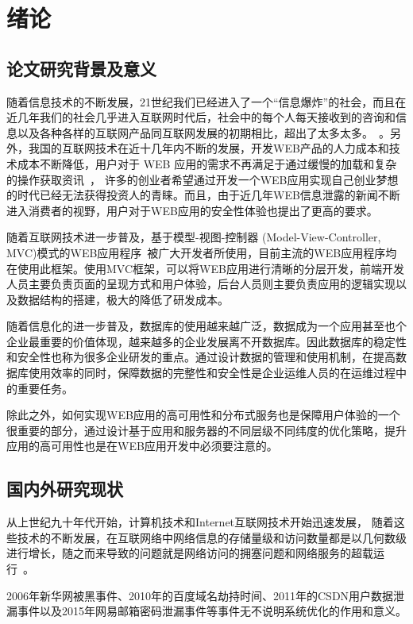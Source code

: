\chapter{绪论}
\label{cha:introduction}
\section{论文研究背景及意义}
随着信息技术的不断发展，21世纪我们已经进入了一个“信息爆炸”的社会，而且在近几年我们的社会几乎进入互联网时代后，社会中的每个人每天接收到的咨询和信息以及各种各样的互联网产品同互联网发展的初期相比，超出了太多太多。~\cite{林薇2015基于}。另外，我国的互联网技术在近十几年内不断的发展，开发WEB产品的人力成本和技术成本不断降低，用户对于 WEB 应用的需求\cite{邵志强2015跨媒体检索平台}不再满足于通过缓慢的加载和复杂的操作获取资讯~\cite{贺海梁2012基于}，
许多的创业者希望通过开发一个WEB应用实现自己创业梦想的时代已经无法获得投资人的青睐。而且，由于近几年WEB信息泄露的新闻不断进入消费者的视野，用户对于WEB应用的安全性体验也提出了更高的要求。

随着互联网技术进一步普及，基于模型-视图-控制器
(Model-View-Controller, MVC)模式的WEB应用程序~\cite{张2010基于}被广大开发者所使用，目前主流的WEB应用程序均在使用此框架。使用MVC框架，可以将WEB应用进行清晰的分层开发，前端开发人员主要负责页面的呈现方式和用户体验，后台人员则主要负责应用的逻辑实现以及数据结构的搭建，极大的降低了研发成本。

随着信息化的进一步普及，数据库的使用越来越广泛，数据成为一个应用甚至也个企业最重要的价值体现，越来越多的企业发展离不开数据库。因此数据库的稳定性和安全性也称为很多企业研发的重点。通过设计数据的管理和使用机制，在提高数据库使用效率的同时，保障数据的完整性和安全性是企业运维人员的在运维过程中的重要任务。

除此之外，如何实现WEB应用的高可用性和分布式服务也是保障用户体验的一个很重要的部分，通过设计基于应用和服务器的不同层级不同纬度的优化策略，提升应用的高可用性也是在WEB应用开发中必须要注意的。

\section{国内外研究现状}
从上世纪九十年代开始，计算机技术和Internet互联网技术开始迅速发展， 随着这些技术的不断发展，在互联网络中网络信息的存储量级和访问数量都是以几何数级进行增长，随之而来导致的问题就是网络访问的拥塞问题和网络服务的超载运行~\cite{王霜2004web}。

2006年新华网被黑事件、2010年的百度域名劫持时间、2011年的CSDN用户数据泄漏事件以及2015年网易邮箱密码泄漏事件等事件无不说明系统优化的作用和意义。

